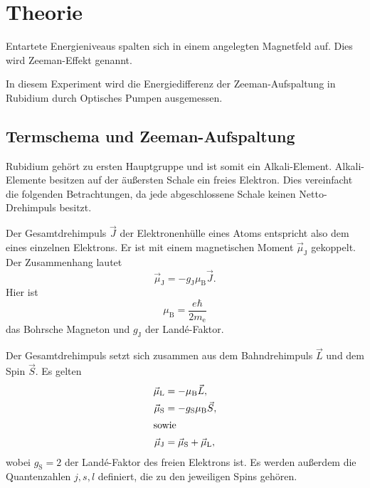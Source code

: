 \section{Theorie}%
\label{sec:theorie}

Entartete Energieniveaus spalten sich in einem angelegten Magnetfeld auf.
Dies wird Zeeman-Effekt genannt.

In diesem Experiment wird die Energiedifferenz der Zeeman-Aufspaltung in
Rubidium durch Optisches Pumpen ausgemessen.


\subsection{Termschema und Zeeman-Aufspaltung}%
\label{sub:termschema_und_zeeman_aufspaltung}

Rubidium gehört zu ersten Hauptgruppe und ist somit ein Alkali-Element.
Alkali-Elemente besitzen auf der äußersten Schale ein freies Elektron.
Dies vereinfacht die folgenden Betrachtungen, da jede abgeschlossene Schale
keinen Netto-Drehimpuls besitzt.

Der Gesamtdrehimpuls $\vec{J}$ der Elektronenhülle eines Atoms entspricht also
dem eines einzelnen Elektrons.
Er ist mit einem magnetischen Moment $\vec{\mu}_{\text{J}}$ gekoppelt.
Der Zusammenhang lautet
\begin{equation}
  \vec{\mu}_{\text{J}} = -g_{\text{J}} \mu_{\text{B}} \vec{J}.
\end{equation}
Hier ist
\begin{equation}
  \mu_{\text{B}} = \frac{e \hbar}{2 m_\text{e}}
\end{equation}
das Bohrsche Magneton und $g_{\text{J}}$ der Land\'e-Faktor.

Der Gesamtdrehimpuls setzt sich zusammen aus dem Bahndrehimpuls $\vec{L}$ und
dem Spin $\vec{S}$.
Es gelten
\begin{align}
  \vec{\mu}_{\text{L}} &= -\mu_{\text{B}} \vec{L}, \\
  \vec{\mu}_{\text{S}} &= -g_{\text{S}} \mu_{\text{B}} \vec{S}, \\
  \intertext{sowie}
  \vec{\mu}_{\text{J}} &= \vec{\mu}_{\text{S}} + \vec{\mu}_{\text{L}},
\end{align}
wobei $g_{\text{S}} = \num{2}$ der Land\'e-Faktor des freien Elektrons ist.
Es werden außerdem die Quantenzahlen $j, s, l$ definiert, die zu den jeweiligen Spins
gehören.

